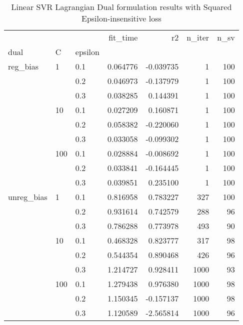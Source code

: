 \begin{table}[H]
\centering
\caption{Linear SVR Lagrangian Dual formulation results with Squared Epsilon-insensitive loss}
\label{linear_lagrangian_dual_l2_svr_cv_results}
\begin{tabular}{lllrrrr}
\toprule
           &     &     &  fit\_time &        r2 &  n\_iter &  n\_sv \\
dual & C & epsilon &           &           &         &       \\
\midrule
reg\_bias & 1   & 0.1 &  0.064776 & -0.039735 &       1 &   100 \\
           &     & 0.2 &  0.046973 & -0.137979 &       1 &   100 \\
           &     & 0.3 &  0.038285 &  0.144391 &       1 &   100 \\
           & 10  & 0.1 &  0.027209 &  0.160871 &       1 &   100 \\
           &     & 0.2 &  0.058382 & -0.220060 &       1 &   100 \\
           &     & 0.3 &  0.033058 & -0.099302 &       1 &   100 \\
           & 100 & 0.1 &  0.028884 & -0.008692 &       1 &   100 \\
           &     & 0.2 &  0.033841 & -0.164445 &       1 &   100 \\
           &     & 0.3 &  0.039851 &  0.235100 &       1 &   100 \\
unreg\_bias & 1   & 0.1 &  0.816958 &  0.783227 &     327 &   100 \\
           &     & 0.2 &  0.931614 &  0.742579 &     288 &    96 \\
           &     & 0.3 &  0.786288 &  0.773978 &     493 &    90 \\
           & 10  & 0.1 &  0.468328 &  0.823777 &     317 &    98 \\
           &     & 0.2 &  0.544354 &  0.890468 &     426 &    96 \\
           &     & 0.3 &  1.214727 &  0.928411 &    1000 &    93 \\
           & 100 & 0.1 &  1.279438 &  0.976380 &    1000 &    98 \\
           &     & 0.2 &  1.150345 & -0.157137 &    1000 &    98 \\
           &     & 0.3 &  1.120589 & -2.565814 &    1000 &    96 \\
\bottomrule
\end{tabular}
\end{table}
